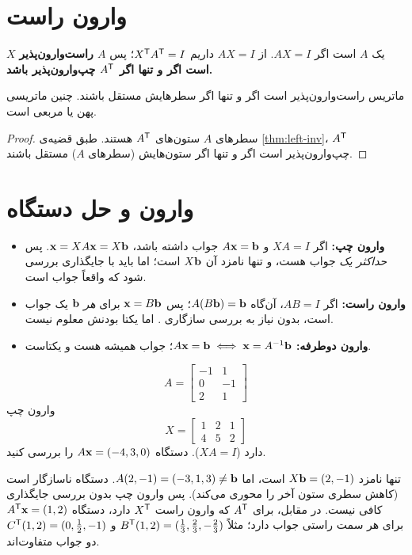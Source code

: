 \section{وارون راست}

\begin{definition}
$X$ یک  $A$ است اگر $AX=I$. از $AX=I$ داریم $X^{\mathsf{T}} A^{\mathsf{T}}=I$؛ پس \textbf{$A$ راست‌وارون‌پذیر است اگر و تنها اگر $A^{\mathsf{T}}$ چپ‌وارون‌پذیر باشد.}
\end{definition}

\begin{theorem}\label{thm:right-inv}
ماتریس راست‌وارون‌پذیر است اگر و تنها اگر سطرهایش مستقل باشند. چنین ماتریسی پهن یا مربعی است.
\end{theorem}
\begin{proof}
سطرهای $A$ ستون‌های $A^{\mathsf{T}}$ هستند. طبق قضیه‌ی \ref{thm:left-inv}، $A^{\mathsf{T}}$ چپ‌وارون‌پذیر است اگر و تنها اگر ستون‌هایش (سطرهای $A$) مستقل باشند.
\end{proof}

\section{وارون و حل دستگاه}

\begin{itemize}
  \item \textbf{وارون چپ:} اگر $XA=I$ و $A\mathbf{x}=\mathbf{b}$ جواب داشته باشد، $\mathbf{x}=XA\mathbf{x}=X\mathbf{b}$. پس \emph{حداکثر یک} جواب هست، و تنها نامزد آن $X\mathbf{b}$ است؛ اما باید با جایگذاری بررسی شود که واقعاً جواب است.
  \item \textbf{وارون راست:} اگر $AB=I$، آن‌گاه $A(B\mathbf{b})=\mathbf{b}$؛ پس $\mathbf{x}=B\mathbf{b}$ برای \emph{هر} $\mathbf{b}$ یک جواب است، بدون نیاز به بررسی سازگاری . اما یکتا بودنش معلوم نیست.
  \item \textbf{وارون دوطرفه:} $A\mathbf{x}=\mathbf{b}\iff\mathbf{x}=A^{-1}\mathbf{b}$؛ جواب همیشه هست و یکتاست.
\end{itemize}

\begin{example}
 
\[
A=\begin{bmatrix}-1&1\\0&-1\\2&1\end{bmatrix}
\]
 وارون چپ 
\[
X=\begin{bmatrix}1&2&1\\4&5&2\end{bmatrix}
\]
دارد ($XA=I$). دستگاه $A\mathbf{x}=(-4,3,0)$ را بررسی کنید.
\end{example}
\begin{solution}
تنها نامزد $X\mathbf{b}=(2,-1)$ است، اما $A(2,-1)=(-3,1,3)\neq\mathbf{b}$. دستگاه ناسازگار  است (کاهش سطری ستون آخر را محوری می‌کند). پس وارون چپ بدون بررسی جایگذاری کافی نیست. در مقابل، برای $A^{\mathsf{T}}$ که وارون راست $X^{\mathsf{T}}$ دارد، دستگاه $A^{\mathsf{T}}\mathbf{x}=(1,2)$ برای هر سمت راستی جواب دارد؛ مثلاً $B^{\mathsf{T}}(1,2)=(\frac13,\frac23,-\frac23)$ و $C^{\mathsf{T}}(1,2)=(0,\frac12,-1)$ دو جواب متفاوت‌اند.
\end{solution}

